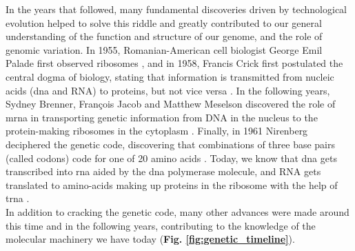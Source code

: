 In the years that followed, many fundamental discoveries driven by technological evolution helped to solve this riddle and greatly contributed to our general understanding of the function and structure of our genome, and the role of genomic variation.
In 1955, Romanian-American cell biologist George Emil Palade first observed ribosomes \cite{palade1955small}, and in 1958, Francis Crick first postulated the central dogma of biology, stating that information is transmitted from nucleic acids (\gls{dna} and RNA) to proteins, but not vice versa \cite{crick1958protein}.
In the following years, Sydney Brenner, François Jacob and Matthew Meselson discovered the role of \gls{mrna} in transporting genetic information from DNA in the nucleus to the protein-making ribosomes in the cytoplasm \cite{brenner1961unstable}.
Finally, in 1961 Nirenberg deciphered the genetic code, discovering that combinations of three base pairs (called codons) code for one of 20 amino acids \cite{nirenberg1961dependence, crick1961general, matthaei1962characteristics, yanofsky2007establishing}.
Today, we know that \gls{dna} gets transcribed into \gls{rna} aided by the \gls{dna} polymerase molecule, and RNA gets translated to amino-acids making up proteins in the ribosome with the help of \gls{trna} \cite{alberts2018molecular}.\\

In addition to cracking the genetic code, many other advances were made around this time and in the following years, contributing to the knowledge of the molecular machinery we have today (\textbf{Fig. \ref{fig:genetic_timeline}}).


